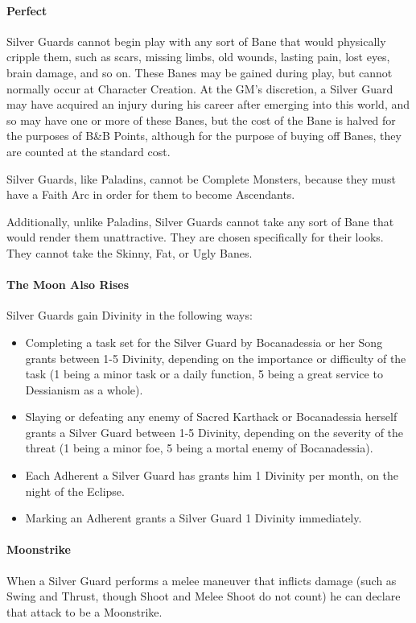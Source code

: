 \documentclass[oneside,11pt,english]{book}
\begin{document}
\paragraph{Perfect}
Silver Guards cannot begin play with any sort of Bane that would physically cripple them, such 
as scars, missing limbs, old wounds, lasting pain, lost eyes, brain damage, and so on. These Banes 
may be gained during play, but cannot normally occur at Character Creation. At the GM's 
discretion, a Silver Guard may have acquired an injury during his career after emerging into this 
world, and so may have one or more of these Banes, but the cost of the Bane is halved for the 
purposes of B\&B Points, although for the purpose of buying off Banes, they are counted at the 
standard cost. 


Silver Guards, like Paladins, cannot be Complete Monsters, because they must have a Faith Arc
in order for them to become Ascendants. 


Additionally, unlike Paladins, Silver Guards cannot take any sort of Bane that would render them unattractive. They are chosen specifically for their looks. They cannot take the Skinny, Fat, or Ugly Banes. 
\paragraph{The Moon Also Rises}
Silver Guards gain Divinity in the following ways: 
\begin{itemize}
\item Completing a task set for the Silver Guard by Bocanadessia or her Song grants between 
1-5 Divinity, depending on the importance or difficulty of the task (1 being a minor task 
or a daily function, 5 being a great service to Dessianism as a whole). 
\item Slaying or defeating any enemy of Sacred Karthack or Bocanadessia herself grants a 
Silver Guard between 1-5 Divinity, depending on the severity of the threat (1 being a 
minor foe, 5 being a mortal enemy of Bocanadessia). 
\item Each Adherent a Silver Guard has grants him 1 Divinity per month, on the night of the 
Eclipse. 
\item Marking an Adherent grants a Silver Guard 1 Divinity immediately. 
\end{itemize}
\paragraph{Moonstrike}
When a Silver Guard performs a melee maneuver that inflicts damage (such as Swing and Thrust, 
though Shoot and Melee Shoot do not count) he can declare that attack to be a Moonstrike. 
\end{document}
